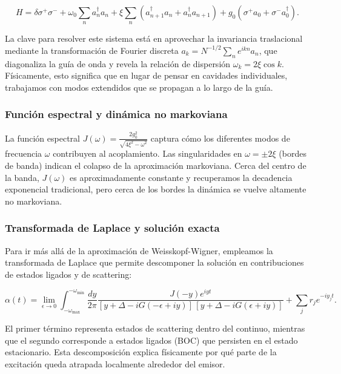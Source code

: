 \documentclass[onecolumn,notitlepage,letterpaper,aps,pra,12pt]{article}
\numberwithin{equation}{section}
\begin{document}
\[H = \delta\sigma^{+}\sigma^{-} + \omega_{0}\sum_{n}a^{\dagger}_{n}a_{n} + \xi\sum_{n}\left(a^{\dagger}_{n+1}a_{n} + a^{\dagger}_{n}a_{n+1}\right) + g_{0}\left(\sigma^{+}a_{0} + \sigma^{-}a^{\dagger}_{0}\right).\]

La clave para resolver este sistema está en aprovechar la invariancia traslacional mediante la transformación de Fourier discreta $a_{k} = N^{-1/2}\sum_{n}e^{ikn}a_{n}$, que diagonaliza la guía de onda y revela la relación de dispersión $\omega_{k} = 2\xi\cos k$. Físicamente, esto significa que en lugar de pensar en cavidades individuales, trabajamos con modos extendidos que se propagan a lo largo de la guía.

\subsubsection{Función espectral y dinámica no markoviana}

La función espectral $J(\omega) = \frac{2g_{0}^{2}}{\sqrt{4\xi^{2}-\omega^{2}}}$ captura cómo los diferentes modos de frecuencia $\omega$ contribuyen al acoplamiento. Las singularidades en $\omega = \pm 2\xi$ (bordes de banda) indican el colapso de la aproximación markoviana. Cerca del centro de la banda, $J(\omega)$ es aproximadamente constante y recuperamos la decadencia exponencial tradicional, pero cerca de los bordes la dinámica se vuelve altamente no markoviana.

\subsubsection{Transformada de Laplace y solución exacta}

Para ir más allá de la aproximación de Weisskopf-Wigner, empleamos la transformada de Laplace que permite descomponer la solución en contribuciones de estados ligados y de scattering:

\[\alpha(t) = \lim_{\epsilon\to 0}\int_{-\omega_{\max}}^{-\omega_{\min}}\frac{dy}{2\pi}\frac{J(-y)e^{iyt}}{[y+\Delta-iG(-\epsilon+iy)]\,[y+\Delta-iG(\epsilon+iy)]} + \sum_{j}r_{j}e^{-iy_{j}t}.\]

El primer término representa estados de scattering dentro del continuo, mientras que el segundo corresponde a estados ligados (BOC) que persisten en el estado estacionario. Esta descomposición explica físicamente por qué parte de la excitación queda atrapada localmente alrededor del emisor.
\end{document}
